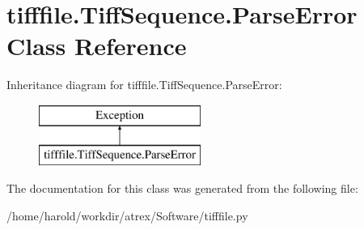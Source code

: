 \hypertarget{classtifffile_1_1TiffSequence_1_1ParseError}{\section{tifffile.\-Tiff\-Sequence.\-Parse\-Error Class Reference}
\label{classtifffile_1_1TiffSequence_1_1ParseError}
}
Inheritance diagram for tifffile.\-Tiff\-Sequence.\-Parse\-Error\-:\begin{figure}[H]
\begin{center}
\leavevmode
\includegraphics[height=2.000000cm]{classtifffile_1_1TiffSequence_1_1ParseError}
\end{center}
\end{figure}


The documentation for this class was generated from the following file\-:\begin{DoxyCompactItemize}
\item 
/home/harold/workdir/atrex/\-Software/tifffile.\-py\end{DoxyCompactItemize}
